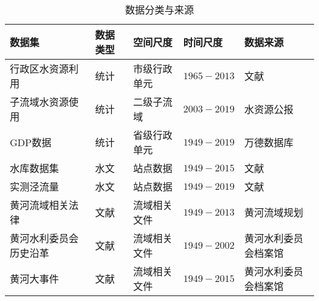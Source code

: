 \begin{table}[htbp]
    \centering
    \caption{数据分类与来源}
      \begin{tabularx}{\textwidth}{p{4cm}LLLp{3cm}}
      \toprule
      数据集   & 数据类型  & 空间尺度  & 时间尺度  & 数据来源 \\
      \midrule
      行政区水资源利用 & 统计    & 市级行政单元 & $1965-2013$ & 文献\cite{zhou2020} \\
      子流域水资源使用 & 统计    & 二级子流域 & $2003-2019$ & 水资源公报 \\
      GDP数据 & 统计    & 省级行政单元 & $1949-2019$ & 万德数据库 \\
      水库数据集 & 水文    & 站点数据  & $1949-2015$ & 文献\cite{wang2019c} \\
      实测泾流量 & 水文    & 站点数据  & $1949-2019$ & 文献\cite{wang2019c} \\
      黄河流域相关法律 & 文献    & 流域相关文件 & $1949-2013$ & 黄河流域规划\cite{shuilibuhuangheshuiliweiyuanhui2010} \\
      黄河水利委员会历史沿革 & 文献    & 流域相关文件 & $1949-2002$ & 黄河水利委员会档案馆 \\
      黄河大事件 & 文献    & 流域相关文件 & $1949-2015$ & 黄河水利委员会档案馆 \\
      \bottomrule
      \end{tabularx}%
    \label{ch4:tab:data_source}%
\end{table}%
  